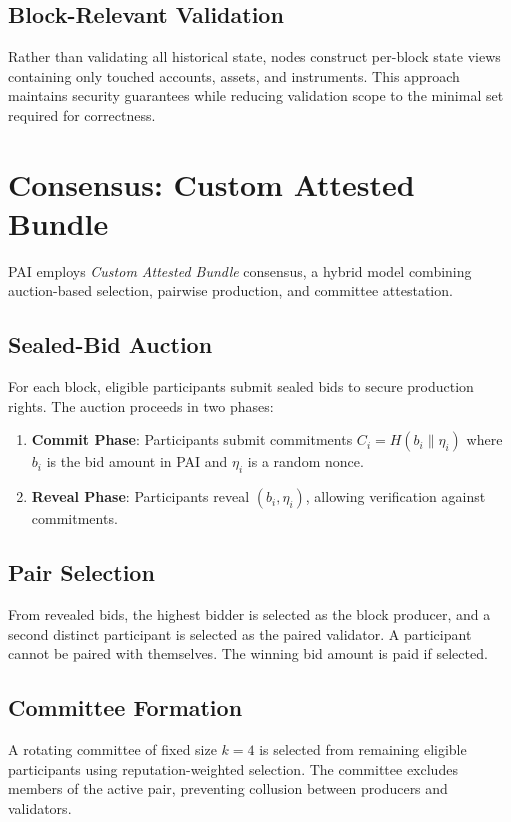 \documentclass[11pt,a4paper]{article}
\begin{document}
\subsection{Block-Relevant Validation}
Rather than validating all historical state, nodes construct per-block state views containing only touched accounts, assets, and instruments. This approach maintains security guarantees while reducing validation scope to the minimal set required for correctness.

\section{Consensus: Custom Attested Bundle}
PAI employs \textit{Custom Attested Bundle} consensus, a hybrid model combining auction-based selection, pairwise production, and committee attestation.

\subsection{Sealed-Bid Auction}
For each block, eligible participants submit sealed bids to secure production rights. The auction proceeds in two phases:

\begin{enumerate}
\item \textbf{Commit Phase}: Participants submit commitments $C_i = H(b_i \| \eta_i)$ where $b_i$ is the bid amount in PAI and $\eta_i$ is a random nonce.
\item \textbf{Reveal Phase}: Participants reveal $(b_i, \eta_i)$, allowing verification against commitments.
\end{enumerate}

\subsection{Pair Selection}
From revealed bids, the highest bidder is selected as the block producer, and a second distinct participant is selected as the paired validator. A participant cannot be paired with themselves. The winning bid amount is paid if selected.

\subsection{Committee Formation}
A rotating committee of fixed size $k=4$ is selected from remaining eligible participants using reputation-weighted selection. The committee excludes members of the active pair, preventing collusion between producers and validators.
\end{document}
